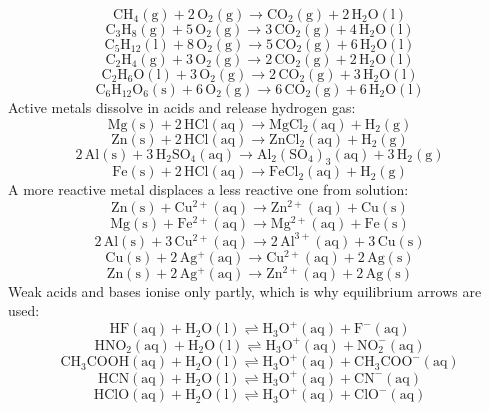 \documentclass[11pt]{article}
\begin{document}
\label{eq034}\[
  \mathrm{CH_4(g)} + 2\,\mathrm{O_2(g)} \longrightarrow \mathrm{CO_2(g)} + 2\,\mathrm{H_2O(l)}
\]
\label{eq035}\[
  \mathrm{C_3H_8(g)} + 5\,\mathrm{O_2(g)} \longrightarrow 3\,\mathrm{CO_2(g)} + 4\,\mathrm{H_2O(l)}
\]
\label{eq036}\[
  \mathrm{C_5H_{12}(l)} + 8\,\mathrm{O_2(g)} \longrightarrow 5\,\mathrm{CO_2(g)} + 6\,\mathrm{H_2O(l)}
\]
\label{eq037}\[
  \mathrm{C_2H_4(g)} + 3\,\mathrm{O_2(g)} \longrightarrow 2\,\mathrm{CO_2(g)} + 2\,\mathrm{H_2O(l)}
\]
\label{eq038}\[
  \mathrm{C_2H_6O(l)} + 3\,\mathrm{O_2(g)} \longrightarrow 2\,\mathrm{CO_2(g)} + 3\,\mathrm{H_2O(l)}
\]
\label{eq039}\[
  \mathrm{C_6H_{12}O_6(s)} + 6\,\mathrm{O_2(g)} \longrightarrow 6\,\mathrm{CO_2(g)} + 6\,\mathrm{H_2O(l)}
\]
Active metals dissolve in acids and release hydrogen gas:\nopagebreak
\label{eq040}\[
  \mathrm{Mg(s)} + 2\,\mathrm{HCl(aq)} \longrightarrow \mathrm{MgCl_2(aq)} + \mathrm{H_2(g)}
\]
\label{eq041}\[
  \mathrm{Zn(s)} + 2\,\mathrm{HCl(aq)} \longrightarrow \mathrm{ZnCl_2(aq)} + \mathrm{H_2(g)}
\]
\label{eq042}\[
  2\,\mathrm{Al(s)} + 3\,\mathrm{H_2SO_4(aq)} \longrightarrow \mathrm{Al_2(SO_4)_3(aq)} + 3\,\mathrm{H_2(g)}
\]
\label{eq043}\[
  \mathrm{Fe(s)} + 2\,\mathrm{HCl(aq)} \longrightarrow \mathrm{FeCl_2(aq)} + \mathrm{H_2(g)}
\]
A more reactive metal displaces a less reactive one from solution:\nopagebreak
\label{eq044}\[
  \mathrm{Zn(s)} + \mathrm{Cu^{2+}(aq)} \longrightarrow \mathrm{Zn^{2+}(aq)} + \mathrm{Cu(s)}
\]
\label{eq045}\[
  \mathrm{Mg(s)} + \mathrm{Fe^{2+}(aq)} \longrightarrow \mathrm{Mg^{2+}(aq)} + \mathrm{Fe(s)}
\]
\label{eq046}\[
  2\,\mathrm{Al(s)} + 3\,\mathrm{Cu^{2+}(aq)} \longrightarrow 2\,\mathrm{Al^{3+}(aq)} + 3\,\mathrm{Cu(s)}
\]
\label{eq047}\[
  \mathrm{Cu(s)} + 2\,\mathrm{Ag^+(aq)} \longrightarrow \mathrm{Cu^{2+}(aq)} + 2\,\mathrm{Ag(s)}
\]
\label{eq048}\[
  \mathrm{Zn(s)} + 2\,\mathrm{Ag^+(aq)} \longrightarrow \mathrm{Zn^{2+}(aq)} + 2\,\mathrm{Ag(s)}
\]
Weak acids and bases ionise only partly, which is why equilibrium arrows are used:\nopagebreak
\label{eq049}\[
  \mathrm{HF(aq)} + \mathrm{H_2O(l)} \rightleftharpoons \mathrm{H_3O^+(aq)} + \mathrm{F^-(aq)}
\]
\label{eq050}\[
  \mathrm{HNO_2(aq)} + \mathrm{H_2O(l)} \rightleftharpoons \mathrm{H_3O^+(aq)} + \mathrm{NO_2^-(aq)}
\]
\label{eq051}\[
  \mathrm{CH_3COOH(aq)} + \mathrm{H_2O(l)} \rightleftharpoons \mathrm{H_3O^+(aq)} + \mathrm{CH_3COO^-(aq)}
\]
\label{eq052}\[
  \mathrm{HCN(aq)} + \mathrm{H_2O(l)} \rightleftharpoons \mathrm{H_3O^+(aq)} + \mathrm{CN^-(aq)}
\]
\label{eq053}\[
  \mathrm{HClO(aq)} + \mathrm{H_2O(l)} \rightleftharpoons \mathrm{H_3O^+(aq)} + \mathrm{ClO^-(aq)}
\]
\end{document}
